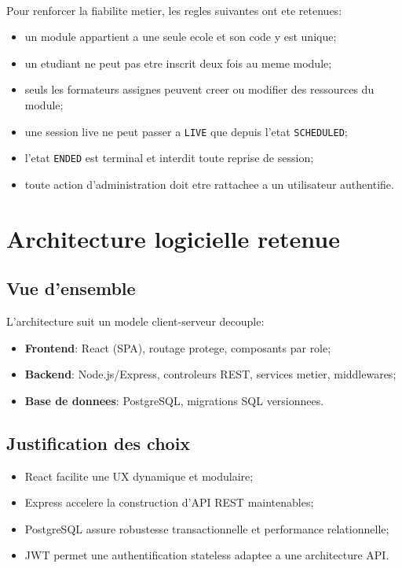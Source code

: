 ﻿﻿\documentclass[12pt,a4paper,oneside]{report}
\begin{document}
Pour renforcer la fiabilite metier, les regles suivantes ont ete retenues:
\begin{itemize}
  \item un module appartient a une seule ecole et son code y est unique;
  \item un etudiant ne peut pas etre inscrit deux fois au meme module;
  \item seuls les formateurs assignes peuvent creer ou modifier des ressources du module;
  \item une session live ne peut passer a \texttt{LIVE} que depuis l'etat \texttt{SCHEDULED};
  \item l'etat \texttt{ENDED} est terminal et interdit toute reprise de session;
  \item toute action d'administration doit etre rattachee a un utilisateur authentifie.
\end{itemize}

\section{Architecture logicielle retenue}

\subsection{Vue d'ensemble}

L'architecture suit un modele client-serveur decouple:
\begin{itemize}
  \item \textbf{Frontend}: React (SPA), routage protege, composants par role;
  \item \textbf{Backend}: Node.js/Express, controleurs REST, services metier, middlewares;
  \item \textbf{Base de donnees}: PostgreSQL, migrations SQL versionnees.
\end{itemize}

\subsection{Justification des choix}

\begin{itemize}
  \item React facilite une UX dynamique et modulaire;
  \item Express accelere la construction d'API REST maintenables;
  \item PostgreSQL assure robustesse transactionnelle et performance relationnelle;
  \item JWT permet une authentification stateless adaptee a une architecture API.
\end{itemize}
\end{document}
